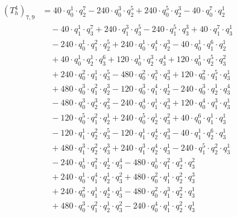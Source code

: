 \begin{align*}(T_{h}^4)_{7,9}&=40\cdot q_0^{1}\cdot q_2^{7}-240\cdot q_0^{3}\cdot q_2^{5}+240\cdot q_0^{5}\cdot q_2^{3}-40\cdot q_0^{7}\cdot q_2^{1}\\
&\quad -40\cdot q_1^{1}\cdot q_3^{7}+240\cdot q_1^{3}\cdot q_3^{5}-240\cdot q_1^{5}\cdot q_3^{3}+40\cdot q_1^{7}\cdot q_3^{1}\\
&\quad -240\cdot q_0^{1}\cdot q_1^{2}\cdot q_2^{5}+240\cdot q_0^{1}\cdot q_1^{4}\cdot q_2^{3}-40\cdot q_0^{1}\cdot q_1^{6}\cdot q_2^{1}\\
&\quad +40\cdot q_0^{1}\cdot q_2^{1}\cdot q_3^{6}+120\cdot q_0^{1}\cdot q_2^{3}\cdot q_3^{4}+120\cdot q_0^{1}\cdot q_2^{5}\cdot q_3^{2}\\
&\quad +240\cdot q_0^{2}\cdot q_1^{1}\cdot q_3^{5}-480\cdot q_0^{2}\cdot q_1^{3}\cdot q_3^{3}+120\cdot q_0^{2}\cdot q_1^{5}\cdot q_3^{1}\\
&\quad +480\cdot q_0^{3}\cdot q_1^{2}\cdot q_2^{3}-120\cdot q_0^{3}\cdot q_1^{4}\cdot q_2^{1}-240\cdot q_0^{3}\cdot q_2^{1}\cdot q_3^{4}\\
&\quad -480\cdot q_0^{3}\cdot q_2^{3}\cdot q_3^{2}-240\cdot q_0^{4}\cdot q_1^{1}\cdot q_3^{3}+120\cdot q_0^{4}\cdot q_1^{3}\cdot q_3^{1}\\
&\quad -120\cdot q_0^{5}\cdot q_1^{2}\cdot q_2^{1}+240\cdot q_0^{5}\cdot q_2^{1}\cdot q_3^{2}+40\cdot q_0^{6}\cdot q_1^{1}\cdot q_3^{1}\\
&\quad -120\cdot q_1^{1}\cdot q_2^{2}\cdot q_3^{5}-120\cdot q_1^{1}\cdot q_2^{4}\cdot q_3^{3}-40\cdot q_1^{1}\cdot q_2^{6}\cdot q_3^{1}\\
&\quad +480\cdot q_1^{3}\cdot q_2^{2}\cdot q_3^{3}+240\cdot q_1^{3}\cdot q_2^{4}\cdot q_3^{1}-240\cdot q_1^{5}\cdot q_2^{2}\cdot q_3^{1}\\
&\quad -240\cdot q_0^{1}\cdot q_1^{2}\cdot q_2^{1}\cdot q_3^{4}-480\cdot q_0^{1}\cdot q_1^{2}\cdot q_2^{3}\cdot q_3^{2}\\
&\quad +240\cdot q_0^{1}\cdot q_1^{4}\cdot q_2^{1}\cdot q_3^{2}+480\cdot q_0^{2}\cdot q_1^{1}\cdot q_2^{2}\cdot q_3^{3}\\
&\quad +240\cdot q_0^{2}\cdot q_1^{1}\cdot q_2^{4}\cdot q_3^{1}-480\cdot q_0^{2}\cdot q_1^{3}\cdot q_2^{2}\cdot q_3^{1}\\
&\quad +480\cdot q_0^{3}\cdot q_1^{2}\cdot q_2^{1}\cdot q_3^{2}-240\cdot q_0^{4}\cdot q_1^{1}\cdot q_2^{2}\cdot q_3^{1}\end{align*}
